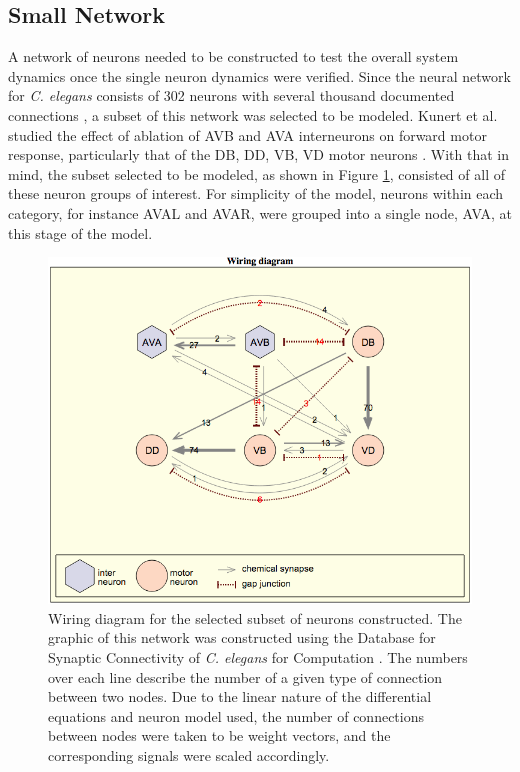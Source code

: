 \documentclass[11pt]{article} %
\begin{document}
\subsection{Small Network}
A network of neurons needed to be constructed to test the overall system dynamics once the single neuron dynamics were verified. Since the neural network for \emph{C. elegans} consists of 302 neurons with several thousand documented connections \cite{Varshney2011}, a subset of this network was selected to be modeled. Kunert et al. studied the effect of ablation of AVB and AVA interneurons on forward motor response, particularly that of the DB, DD, VB, VD motor neurons \cite{Kunert2014}. With that in mind, the subset selected to be modeled, as shown in Figure \ref{fig:f2}, consisted of all of these neuron groups of interest. For simplicity of the model, neurons within each category, for instance  AVAL and AVAR, were grouped into a single node, AVA, at this stage of the model.
\begin{figure}[h!]
\begin{center}
\includegraphics[scale=0.35]{motn_fig2.png} \caption[h2]{Wiring diagram for the selected subset of neurons constructed. The graphic of this network was constructed using the Database for Synaptic Connectivity of \emph{C. elegans} for Computation \cite{Oshio2003}. The numbers over each line describe the number of a given type of connection between two nodes. Due to the linear nature of the differential equations and neuron model used, the number of connections between nodes were taken to be weight vectors, and the corresponding signals were scaled accordingly.} \label{fig:f2} \end{center}
\end{figure}
\end{document}
